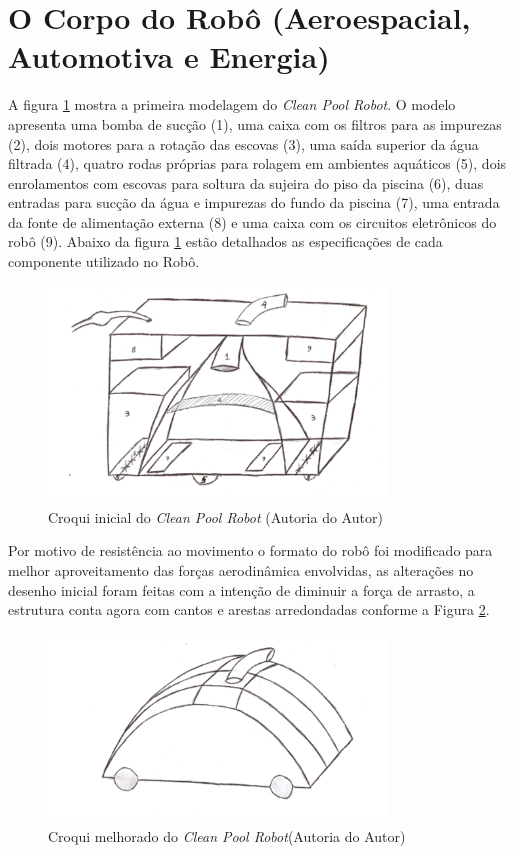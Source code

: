 \section{O Corpo do Robô (Aeroespacial, Automotiva e Energia)}
A figura \ref{fig:initial_croqui} mostra a primeira modelagem do \textit{Clean Pool Robot}. O modelo
apresenta uma bomba de sucção (1), uma caixa com os filtros para as impurezas
(2), dois motores para a rotação das escovas (3), uma saída superior da água
filtrada (4), quatro rodas próprias para rolagem em ambientes aquáticos (5),
dois enrolamentos com escovas para soltura da sujeira do piso da piscina (6),
duas entradas para sucção da água e impurezas do fundo da piscina (7), uma
entrada da fonte de alimentação externa (8) e uma caixa com os circuitos
eletrônicos do robô (9). Abaixo da figura \ref{fig:initial_croqui} estão detalhados as especificações
de cada componente utilizado no Robô.
\par
\begin{figure}[h]
  \centering
  \includegraphics[width=0.8\textwidth]{figures/croqui.png}
  \caption{ Croqui inicial do \textit{Clean Pool Robot} (\textsf{Autoria do Autor})}
  \label{fig:initial_croqui}
\end{figure}
\FloatBarrier
\par
Por motivo de resistência ao movimento o formato do robô foi modificado para
melhor aproveitamento das forças aerodinâmica envolvidas, as alterações no
desenho inicial foram feitas com a intenção de diminuir a força de arrasto, a
estrutura conta agora com cantos e arestas arredondadas conforme a Figura \ref{fig:better-croqui}.
\par
\begin{figure}[h]
  \centering
  \includegraphics[width=0.8\textwidth]{figures/better-croqui.png}
  \caption{ Croqui melhorado do \textit{Clean Pool Robot}(\textsf{Autoria do Autor})}
  \label{fig:better-croqui}
\end{figure}
